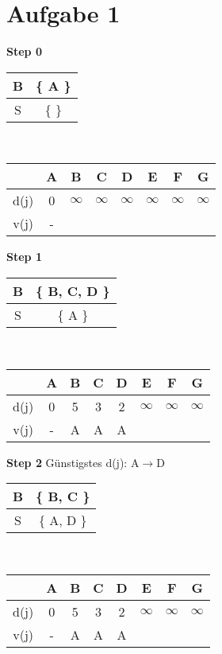 \documentclass[a4paper,11pt]{article}
\begin{document}
\raggedright %

\section*{Aufgabe 1}

{\setlength{\columnseprule}{.1pt}
\setlength{\columnsep}{3cm}
\begin{multicols}{2}

\textbf{Step 0} \\
\begin{tabular}{ |c|c| } 
  \hline
  B & \{ A \} \\
  \hline
  S & \{  \} \\ 
  \hline
 \end{tabular} \\
\begin{tabular}{ |c|c|c|c|c|c|c|c| } 
  \hline
       & A & B & C & D & E & F & G \\
  \hline
  d(j) & 0 & $\infty$ & $\infty$ & $\infty$ & $\infty$ & $\infty$ & $\infty$ \\
  \hline
  v(j) & - &  &  &  &  &  &  \\
  \hline
\end{tabular}
\vspace{4mm}

\textbf{Step 1} \\
\begin{tabular}{ |c|c| } 
  \hline
  B & \{ B, C, D \} \\
  \hline
  S & \{ A \} \\ 
  \hline
 \end{tabular} \\
\begin{tabular}{ |c|c|c|c|c|c|c|c| } 
  \hline
       & A & B & C & D & E & F & G \\
  \hline
  d(j) & 0 & 5 & 3 & 2 & $\infty$ & $\infty$ & $\infty$ \\
  \hline
  v(j) & - & A & A & A &  &  &  \\
  \hline
\end{tabular}
\vspace{4mm}

\textbf{Step 2} Günstigstes d(j): A$\to$D \\
\begin{tabular}{ |c|c| } 
  \hline
  B & \{ B, C \} \\
  \hline
  S & \{ A, D \} \\ 
  \hline
 \end{tabular} \\
\begin{tabular}{ |c|c|c|c|c|c|c|c| } 
  \hline
       & A & B & C & D & E & F & G \\
  \hline
  d(j) & 0 & 5 & 3 & 2 & $\infty$ & $\infty$ & $\infty$ \\
  \hline
  v(j) & - & A & A & A &  &  &  \\
  \hline
\end{tabular}
\vspace{4mm}


\end{multicols}}
\end{document}
